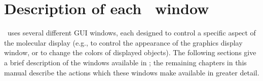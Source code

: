 %
%
%


\section{Description of each \VMD\ window}
\label{ug:ui:windows}

\VMD\ uses several different GUI windows, each designed to control a specific
aspect of the molecular display (e.g., to control the appearance of the
graphics display window, or to change the colors of displayed objects). The
following sections give a brief description of the windows available in \VMD; 
the remaining chapters in this manual describe the actions which these 
windows make available in greater detail.



















